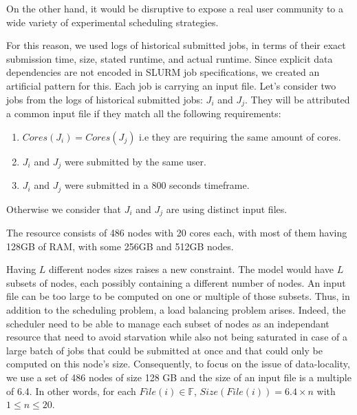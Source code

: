 \documentclass[conference,10pt]{IEEEtran}
\newcommand{\file}{\ensuremath{\mathit{File}}\xspace}
\newcommand{\size}{\ensuremath{\mathit{Size}}\xspace}
\newcommand{\core}{\mathit{Cores}\xspace}
\newcommand{\fileset}{\ensuremath{\mathbb{F}}\xspace}
\begin{document}
On the other hand, it would be disruptive to expose a real user community to a wide variety of experimental scheduling strategies.

For this reason, we used logs of historical submitted jobs, in terms of their exact submission time, size, stated runtime, and actual runtime.
Since explicit data dependencies are not encoded in SLURM job specifications, we created an artificial pattern for this. 
Each job is carrying an input file.
Let's consider two jobs from the logs of historical submitted jobs: $J_i$ and $J_j$.
They will be attributed a common input file if they match all the following requirements:
\begin{enumerate}
	\item $\core(J_i) = \core(J_j)$ i.e they are requiring the same amount of cores.
	\item $J_i$ and $J_j$ were submitted by the same user.
	\item $J_i$ and $J_j$ were submitted in a 800 seconds timeframe.
\end{enumerate}
Otherwise we consider that $J_i$ and $J_j$ are using distinct input files.

The resource consists of 486 nodes with 20 cores each, with most of them having 128GB of RAM, with some 256GB and 512GB nodes. 

Having $L$ different nodes sizes raises a new constraint. The model would have
$L$ subsets of nodes, each possibly containing a different number of nodes.
An input file can be too large to be computed on one or multiple of those subsets.
Thus, in addition to the scheduling problem, a load balancing problem arises.
Indeed, the scheduler need to be able to manage each subset of nodes as an independant 
resource that need to avoid starvation while also not being saturated in case of a large
batch of jobs that could be submitted at once and that could only be computed on this node's size.
Consequently, to focus on the issue of data-locality, we use a set of 486 nodes of size 
128 GB and the size of an input file is a multiple of 6.4.
In other words, for each $\file(i) \in \fileset$, $\size(\file(i)) = 6.4 \times n$ with 
$1 \leq n \leq 20$.
\end{document}
